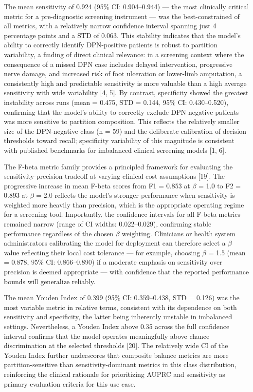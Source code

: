 \documentclass[pdflatex,sn-vancouver-num]{sn-jnl}
\begin{document}
The mean sensitivity of 0.924 (95\% CI: 0.904–0.944) — the most clinically critical metric for a pre-diagnostic screening instrument — was the best-constrained of all metrics, with a relatively narrow confidence interval spanning just 4 percentage points and a STD of 0.063. This stability indicates that the model's ability to correctly identify DPN-positive patients is robust to partition variability, a finding of direct clinical relevance: in a screening context where the consequence of a missed DPN case includes delayed intervention, progressive nerve damage, and increased risk of foot ulceration or lower-limb amputation, a consistently high and predictable sensitivity is more valuable than a high average sensitivity with wide variability [4, 5]. By contrast, specificity showed the greatest instability across runs (mean = 0.475, STD = 0.144, 95\% CI: 0.430–0.520), confirming that the model's ability to correctly exclude DPN-negative patients was more sensitive to partition composition. This reflects the relatively smaller size of the DPN-negative class (n = 59) and the deliberate calibration of decision thresholds toward recall; specificity variability of this magnitude is consistent with published benchmarks for imbalanced clinical screening models [1, 6].

The F-beta metric family provides a principled framework for evaluating the sensitivity-precision tradeoff at varying clinical cost assumptions [19]. The progressive increase in mean F-beta scores from F1 = 0.853 at $\beta$ = 1.0 to F2 = 0.893 at $\beta$ = 2.0 reflects the model's stronger performance when sensitivity is weighted more heavily than precision, which is the appropriate operating regime for a screening tool. Importantly, the confidence intervals for all F-beta metrics remained narrow (range of CI widths: 0.022–0.029), confirming stable performance regardless of the chosen $\beta$ weighting. Clinicians or health system administrators calibrating the model for deployment can therefore select a $\beta$ value reflecting their local cost tolerance — for example, choosing $\beta$ = 1.5 (mean = 0.878, 95\% CI: 0.866–0.890) if a moderate emphasis on sensitivity over precision is deemed appropriate — with confidence that the reported performance bounds will generalize reliably.

The mean Youden Index of 0.399 (95\% CI: 0.359–0.438, STD = 0.126) was the most variable metric in relative terms, consistent with its dependence on both sensitivity and specificity, the latter being inherently unstable in imbalanced settings. Nevertheless, a Youden Index above 0.35 across the full confidence interval confirms that the model operates meaningfully above chance discrimination at the selected thresholds [20]. The relatively wide CI of the Youden Index further underscores that composite balance metrics are more partition-sensitive than sensitivity-dominant metrics in this class distribution, reinforcing the clinical rationale for prioritizing AUPRC and sensitivity as primary evaluation criteria for this use case.
\end{document}
